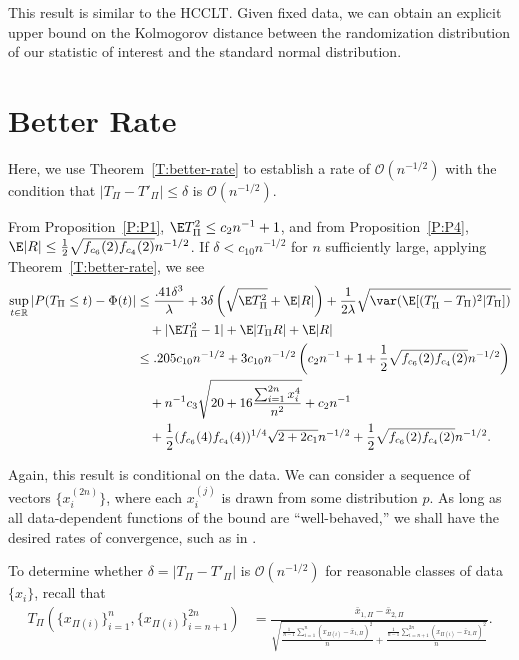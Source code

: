 This result is similar to the HCCLT.  Given fixed data, we can obtain an explicit
upper bound on the Kolmogorov distance between the randomization distribution of
our statistic of interest and the standard normal distribution.

\section{Better Rate}
\label{S:better-rate}
Here, we use Theorem~\ref{T:better-rate} to establish a rate of
$\mathcal{O}(n^{-1/2})$ with the condition that $|T_{\Pi}-T'_{\Pi}| \leq \delta$
is $\mathcal{O}(n^{-1/2})$.

From Proposition~\ref{P:P1}, $\E T_{\Pi}^2 \leq c_2 n^{-1} + 1$, and
from Proposition~\ref{P:P4}, $\E|R| \leq
\frac{1}{2}\sqrt{f_{c_6}(2)f_{c_4}(2)} n^{-1/2}$.
If $\delta < c_{10}n^{-1/2}$ for $n$ sufficiently large, applying
Theorem~\ref{T:better-rate}, we see
\begin{equation*}
  \begin{split}
    \sup_{t \in \mathbb{R}} |P(T_{\Pi} \leq t) - \Phi(t)|
    &\leq \frac{.41 \delta^3}{\lambda} + 3 \delta \left ( \sqrt{\E T_{\Pi}^2} + \E |R| \right )
    + \frac{1}{2\lambda} \sqrt{\var (\E [(T_{\Pi}'-T_{\Pi})^2|T_{\Pi}])} \\
    &\quad + |\E T_{\Pi}^2 - 1| + \E |T_{\Pi} R| + \E |R| \\
    &\leq .205 c_{10} n^{-1/2} + 3c_{10} n^{-1/2} \left (
      c_2 n^{-1} + 1 + \frac{1}{2}\sqrt{f_{c_6}(2)f_{c_4}(2)} n^{-1/2}
      \right ) \\
    &\quad + n^{-1} c_3\sqrt{20 + 16\frac{\sum_{i=1}^{2n} x_{i}^4}{n^2}} + c_2 n^{-1} \\
    &\quad + \frac{1}{2}(f_{c_6}(4)f_{c_4}(4))^{1/4} \sqrt{2+2c_1} n^{-1/2} +
    \frac{1}{2}\sqrt{f_{c_6}(2)f_{c_4}(2)} n^{-1/2}.
  \end{split}
\end{equation*}

Again, this result is conditional on the data.  We can consider a sequence
of vectors $\{x_i^{(2n)}\}$, where each $x_i^{(j)}$ is drawn from some distribution $p$.
As long as all data-dependent functions of the bound are ``well-behaved,'' we shall
have the desired rates of convergence, such as in \cite{bolthausen1984estimate}.

To determine whether $\delta = |T_{\Pi}-T'_{\Pi}|$ is
$\mathcal{O}(n^{-1/2})$ for reasonable classes of data $\{x_i\}$, recall that
\begin{align*}
T_{\Pi}(\{x_{\Pi(i)}\}_{i=1}^n, \{x_{\Pi(i)}\}_{i=n+1}^{2n})
&= \frac{\bar{x}_{1,\Pi} - \bar{x}_{2,\Pi}}{\sqrt{\frac{\frac{1}{n-1}
      \sum_{i=1}^n(x_{\Pi(i)} - \bar{x}_{1,\Pi})^2}{n} + \frac{\frac{1}{n-1}
      \sum_{i=n+1}^{2n}(x_{\Pi(i)} - \bar{x}_{2,\Pi})^2}{n}}}. \\
\end{align*}

